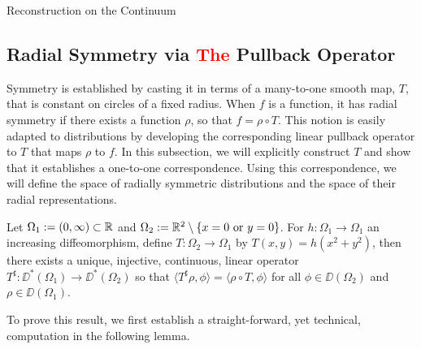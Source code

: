 \begin{chapter}{Reconstruction on the Continuum}
\subsection{Radial Symmetry via \textcolor{red}{The} Pullback Operator} \label{sec:pullback}
Symmetry is established by casting it in terms of a many-to-one smooth map, $T$, that is constant on circles of a fixed radius.  
When $f$ is a function, it has radial symmetry if there exists a function $\rho$, so that $f = \rho \circ T$.
This notion is easily adapted to distributions by developing the corresponding linear pullback operator to $T$ that maps $\rho$ to $f$.
In this subsection, we will explicitly construct $T$ and show that it establishes a one-to-one correspondence. 
Using this correspondence, we will define the space of radially symmetric distributions and the space of their radial representations.

\begin{thm} \label{thm:pullback}
  Let $\Omega_1 := (0,\infty) \subset \mathbb R$ and $\Omega_2 := \mathbb R^2 \setminus \{x = 0\text{ or }y=0\}$.
  For $h:\Omega_1\to\Omega_1$ an increasing diffeomorphism, define $T:\Omega_2 \to \Omega_1$ by $T(x,y) = h(x^2 + y^2)$, then there exists a unique, injective, continuous, linear operator $T^\sharp:\DD^*(\Omega_1) \to \DD^*(\Omega_2)$ so that $\langle T^\sharp \rho ,\phi\rangle = \langle \rho \circ T,\phi\rangle$ for all $\phi \in \DD(\Omega_2)$ and $\rho \in \DD(\Omega_1)$.
\end{thm}

To prove this result, we first establish a straight-forward, yet technical, computation in the following lemma.


\end{chapter}
